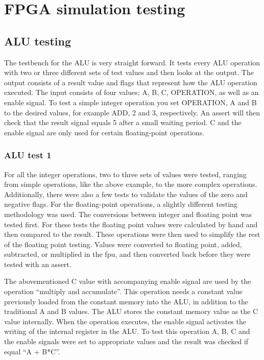 \section{FPGA simulation testing}\label{section:fpga-simulation-testing}


\subsection{ALU testing}

The testbench for the ALU is very straight forward. It tests every ALU operation
with two or three different sets of test values and then looks at the output.
The output consists of a result value and flags that represent how the ALU
operation executed. The input consists of four values; A, B, C, OPERATION, as
well as an enable signal. To test a simple integer operation you set OPERATION,
A and B to the desired values, for example ADD, 2 and 3, respectively. An assert
will then check that the result signal equals 5 after a small waiting period. C
and the enable signal are only used for certain floating-point operations.

\subsubsection{ALU test 1}

For all the integer operations, two to three sets of values were tested, ranging
from simple operations, like the above example, to the more complex operations.
Additionally, there were also a few tests to validate the values of the zero and
negative  flags. For the floating-point
operations, a slightly different testing methodology was used. The conversions
between integer and floating point was tested first. For these tests the
floating point values were calculated by hand and then compared to the result.
These operations were then used to simplify the rest of the floating point
testing. Values were converted to floating point, added, subtracted, or
multiplied in the fpu, and then converted back before they were tested with an
assert.

The abovementioned C value with accompanying enable signal are used by the
operation ``multiply and accumulate''. This operation needs a constant value
previously loaded from the constant memory into the ALU, in addition to the
traditional A and B values. The ALU stores the constant memory value as the C
value internally. When the operation executes, the enable signal activates the
writing of the internal register in the ALU. To test this operation A, B, C and
the enable signals were set to appropriate values and the result was checked if
equal ``A + B*C''.

